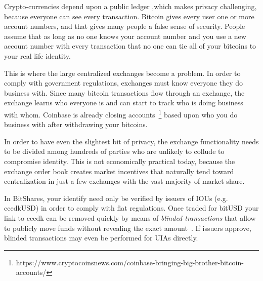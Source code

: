 Crypto-currencies depend upon a public ledger ,which makes privacy challenging,
because everyone can see every transaction. Bitcoin gives every user one or
more account numbers, and that gives many people a false sense of security.
People assume that as long as no one knows your account number and you use a
new account number with every transaction that no one can tie all of your
bitcoins to your real life identity.

This is where the large centralized exchanges become a problem. In order to
comply with government regulations, exchanges must know everyone they do
business with. Since many bitcoin transactions flow through an exchange, the
exchange learns who everyone is and can start to track who is doing business
with whom. Coinbase is already closing
accounts~\footnote{https://www.cryptocoinsnews.com/coinbase-bringing-big-brother-bitcoin-accounts/}
based upon who you do business with after withdrawing your bitcoins.

In order to have even the slightest bit of privacy, the exchange functionality
needs to be divided among hundreds of parties who are unlikely to collude to
compromise identity. This is not economically practical today, because the
exchange order book creates market incentives that naturally tend toward
centralization in just a few exchanges with the vast majority of market share.

In BitShares, your identify need only be verified by issuers of IOUs (e.g.
ccedkUSD) in order to comply with fiat regulations. Once traded for bitUSD your
link to ccedk can be removed quickly by means of \emph{blinded transactions}
that allow to publicly move funds without revealing the exact
amount~\cite{bts:general,blindSigPaper}. If issuers approve, blinded
transactions may even be performed for UIAs directly.
